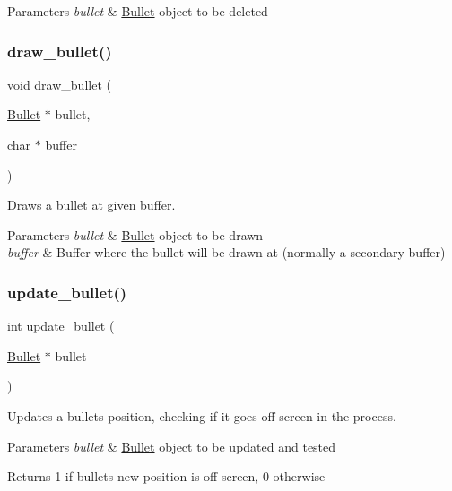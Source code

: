 \begin{DoxyParams}{Parameters}
{\em bullet} & \hyperlink{struct_bullet}{Bullet} \textquotesingle{}object\textquotesingle{} to be deleted \\
\hline
\end{DoxyParams}
\hypertarget{group__bullet_ga9227bafd4863d90378dbcc48ebf68b93}{}\label{group__bullet_ga9227bafd4863d90378dbcc48ebf68b93} 
\subsubsection{\texorpdfstring{draw\+\_\+bullet()}{draw\_bullet()}}
{\footnotesize\ttfamily void draw\+\_\+bullet (\begin{DoxyParamCaption}\item[{\hyperlink{struct_bullet}{Bullet} $\ast$}]{bullet,  }\item[{char $\ast$}]{buffer }\end{DoxyParamCaption})}



Draws a bullet at given buffer. 


\begin{DoxyParams}{Parameters}
{\em bullet} & \hyperlink{struct_bullet}{Bullet} \textquotesingle{}object\textquotesingle{} to be drawn \\
\hline
{\em buffer} & Buffer where the bullet will be drawn at (normally a secondary buffer) \\
\hline
\end{DoxyParams}
\hypertarget{group__bullet_ga18a96b8efbc45b8cbc1429f3660bae57}{}\label{group__bullet_ga18a96b8efbc45b8cbc1429f3660bae57} 
\subsubsection{\texorpdfstring{update\+\_\+bullet()}{update\_bullet()}}
{\footnotesize\ttfamily int update\+\_\+bullet (\begin{DoxyParamCaption}\item[{\hyperlink{struct_bullet}{Bullet} $\ast$}]{bullet }\end{DoxyParamCaption})}



Updates a bullet\textquotesingle{}s position, checking if it goes off-\/screen in the process. 


\begin{DoxyParams}{Parameters}
{\em bullet} & \hyperlink{struct_bullet}{Bullet} \textquotesingle{}object\textquotesingle{} to be updated and tested \\
\hline
\end{DoxyParams}
\begin{DoxyReturn}{Returns}
1 if bullet\textquotesingle{}s new position is off-\/screen, 0 otherwise 
\end{DoxyReturn}
